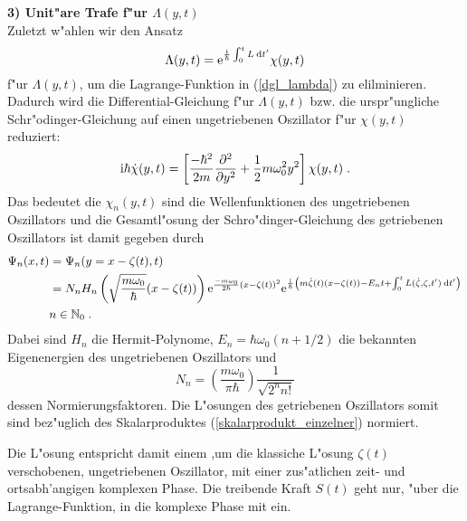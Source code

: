     \textbf{3) Unit"are Trafe f"ur $\Lambda(y,t)$}\\
    Zuletzt w"ahlen wir den Ansatz
    \begin{equation}
      \Lambda(y,t) = \text e^{\frac{\text i}{\hbar}\int_0^tL \: \text d t'}\chi(y,t)
    \end{equation}
    f"ur $\Lambda(y,t)$, um die Lagrange-Funktion in (\ref{dgl_lambda}) zu elilminieren.
    Dadurch wird die Differential-Gleichung f"ur $\Lambda(y,t)$ bzw. die urspr"ungliche Schr"odinger-Gleichung auf einen ungetriebenen Oszillator f"ur $\chi(y,t)$ reduziert:
    \begin{equation}
      \text i \hbar \dot \chi(y,t) = \left[ \frac{-\hbar^2}{2m}\frac{\partial^2}{\partial y^2} + \frac{1}{2}m\omega_0^2y^2 \right]\chi(y,t) \; .
    \end{equation}
    Das bedeutet die $\chi_n(y,t)$ sind die Wellenfunktionen des ungetriebenen Oszillators und die Gesamtl"osung der Schro"dinger-Gleichung des getriebenen Oszillators ist damit gegeben durch
    \begin{align}
      \begin{split}
      \Psi_n(x,t) &= \Psi_n(y=x-\zeta(t),t) \\
      &= N_nH_n\left(\sqrt{\frac{m\omega_0}{\hbar}}(x-\zeta(t))\right) \text e^{\frac{-m\omega_0}{2\hbar}(x-\zeta(t))^2} \text e^{\frac{\text i}{\hbar}\left(m\dot \zeta(t)(x-\zeta(t))-E_nt+\int_0^tL(\dot \zeta,\zeta,t')\:\text dt'\right)}\\
      &n \in \mathbb{N}_0 \; .
    \end{split}
    \end{align}
    Dabei sind $H_n$ die Hermit-Polynome, $E_n = \hbar \omega_0(n+1/2)$ die bekannten Eigenenergien des ungetriebenen Oszillators und
    \begin{equation}
      N_n = \left(\frac{m\omega_0}{\pi \hbar}\right) \frac{1}{\sqrt{2^nn!}}
    \end{equation}
    dessen Normierungsfaktoren.
    Die L"osungen des getriebenen Oszillators somit sind bez"uglich des Skalarproduktes (\ref{skalarprodukt_einzelner}) normiert.

    Die L"osung entspricht damit einem ,um die klassiche L"osung $\zeta(t)$ verschobenen, ungetriebenen Oszillator, mit einer zus"atlichen zeit- und ortsabh'angigen komplexen Phase.
    Die treibende Kraft $S(t)$ geht nur, "uber die Lagrange-Funktion, in die komplexe Phase mit ein.



